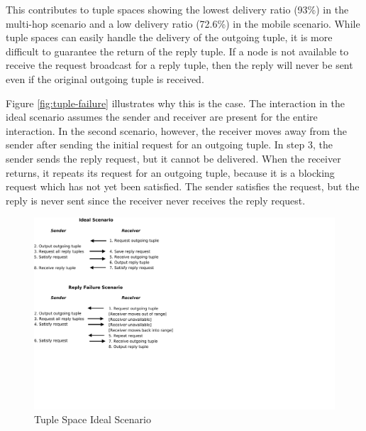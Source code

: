 This contributes to tuple spaces showing the lowest delivery ratio (93\%) in the multi-hop scenario and a low delivery ratio (72.6\%) in the mobile scenario. While tuple spaces can easily handle the delivery of the outgoing tuple, it is more difficult to guarantee the return of the reply tuple. If a node is not available to receive the request broadcast for a reply tuple, then the reply will never be sent even if the original outgoing tuple is received.

Figure \ref{fig:tuple-failure} illustrates why this is the case. The interaction in the ideal scenario assumes the sender and receiver are present for the entire interaction. In the second scenario, however, the receiver moves away from the sender after sending the initial request for an outgoing tuple. In step 3, the sender sends the reply request, but it cannot be delivered. When the receiver returns, it repeats its request for an outgoing tuple, because it is a blocking request which has not yet been satisfied. The sender satisfies the request, but the reply is never sent since the receiver never receives the reply request.

\begin{figure}
\centering
\includegraphics[scale = 1 , clip, trim = 0px 400px 500px 35px]{figures/tuple-failure.pdf}
\caption{Tuple Space Ideal Scenario}
\label{fig:tuple-success}
\end{figure}


